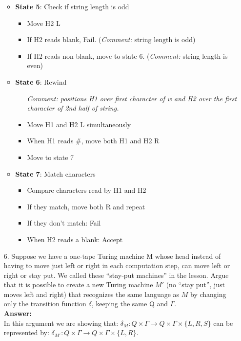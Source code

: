 \documentclass[12pt]{article}
\begin{document}
\begin{itemize}
\begin{itemize}
\begin{itemize}
	\end{itemize}\vspace{.2in}
	\item \textbf{State 5}: Check if string length is odd
	\begin{itemize}
	\item  Move H2 L
	\item  If H2 reads blank, Fail. (\textit{Comment:} string length is odd)
	\item  If H2 reads non-blank, move to state 6. (\textit{Comment:} string length is even)
	\end{itemize}\vspace{.2in}
	\item \textbf{State 6}: Rewind
	\begin{itemize}
	\item[] \textit{Comment: positions H1 over first character of w and H2 over the first character of 2nd half of string.}
	\item Move H1 and H2 L simultaneously
	\item When H1 reads \#, move both H1 and H2 R
	\item Move to state 7
	\end{itemize}\vspace{.2in}
	\item \textbf{State 7}: Match characters
	\begin{itemize}
	\item Compare characters read by H1 and H2
	\item If they match, move both R and repeat
	\item If they don't match: Fail
	\item When H2 reads a blank: Accept
	\end{itemize}
	\end{itemize}
	\vspace{.2in}
	\newpage
\item[{\rm 6.}] Suppose we have a one-tape Turing machine M whose head instead of having to move just left or right in each computation step, can move left or right or stay put.  We called these ``stay-put machines'' in the lesson.  Argue that it is possible to create a new Turing machine $M'$ (no ``stay put'', just moves left and right) that recognizes the same language as $M$ by changing only the transition function $\delta$, keeping the same Q and $\Gamma$.
	\\[.2in]\textbf{Answer:}
	\\[.2in] In this argument we are showing that: $\delta_{M}: Q \times \Gamma \rightarrow Q \times \Gamma \times \{L,R,S\}$ can be represented by: $\delta_{M'}: Q \times \Gamma \rightarrow Q \times \Gamma \times \{L,R\}$.

\end{itemize}
\end{document}
